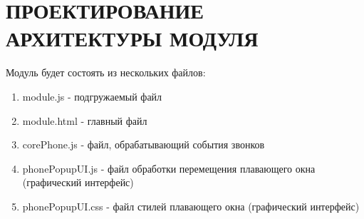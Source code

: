 \chapter{ПРОЕКТИРОВАНИЕ АРХИТЕКТУРЫ МОДУЛЯ}
Модуль будет состоять из нескольких файлов:
\begin{enumerate}
\item module.js - подгружаемый файл
\item module.html - главный файл
\item corePhone.js - файл, обрабатывающий события звонков
\item phonePopupUI.js - файл обработки перемещения плавающего окна (графический интерфейс)
\item phonePopupUI.css - файл стилей плавающего окна (графический интерфейс)
\end{enumerate}

